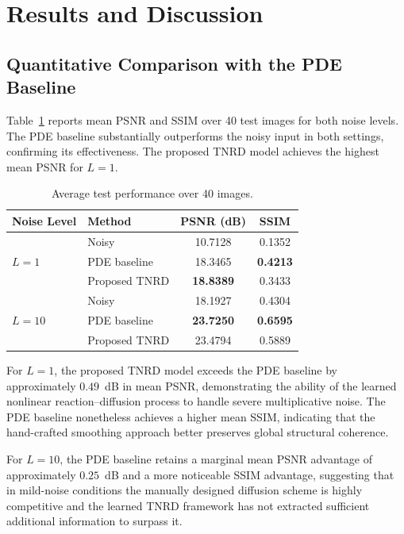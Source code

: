 \documentclass[conference]{IEEEtran}
\begin{document}
\section{Results and Discussion}

\subsection{Quantitative Comparison with the PDE Baseline}
Table~\ref{tab:main_results} reports mean PSNR and SSIM over 40 test images for
both noise levels. The PDE baseline substantially outperforms the noisy input in
both settings, confirming its effectiveness. The proposed TNRD model achieves the
highest mean PSNR for $L=1$.

\begin{table}[t]
  \centering
  \caption{Average test performance over 40 images.}
  \label{tab:main_results}
  \begin{tabular}{llcc}
    \toprule
    Noise Level & Method & PSNR (dB) & SSIM \\
    \midrule
    \multirow{3}{*}{$L=1$}
      & Noisy          & 10.7128 & 0.1352 \\
      & PDE baseline   & 18.3465 & \textbf{0.4213} \\
      & Proposed TNRD  & \textbf{18.8389} & 0.3433 \\
    \midrule
    \multirow{3}{*}{$L=10$}
      & Noisy          & 18.1927 & 0.4304 \\
      & PDE baseline   & \textbf{23.7250} & \textbf{0.6595} \\
      & Proposed TNRD  & 23.4794 & 0.5889 \\
    \bottomrule
  \end{tabular}
\end{table}

For $L=1$, the proposed TNRD model exceeds the PDE baseline by approximately
$0.49$~dB in mean PSNR, demonstrating the ability of the learned nonlinear
reaction--diffusion process to handle severe multiplicative noise. The PDE baseline
nonetheless achieves a higher mean SSIM, indicating that the hand-crafted smoothing
approach better preserves global structural coherence.

For $L=10$, the PDE baseline retains a marginal mean PSNR advantage of approximately
$0.25$~dB and a more noticeable SSIM advantage, suggesting that in mild-noise
conditions the manually designed diffusion scheme is highly competitive and the
learned TNRD framework has not extracted sufficient additional information to
surpass it.
\end{document}
